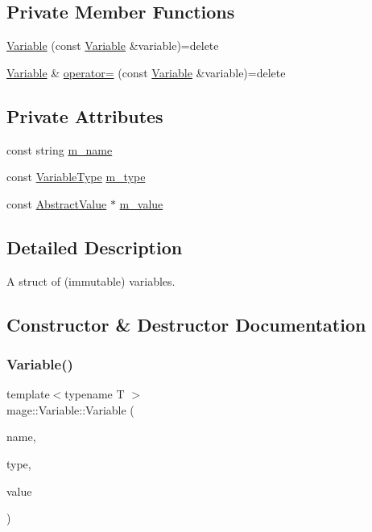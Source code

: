 \subsection*{Private Member Functions}
\begin{DoxyCompactItemize}
\item 
\hyperlink{structmage_1_1_variable_a95b243cd65ea2f9be716545e6c4f4b8e}{Variable} (const \hyperlink{structmage_1_1_variable}{Variable} \&variable)=delete
\item 
\hyperlink{structmage_1_1_variable}{Variable} \& \hyperlink{structmage_1_1_variable_a99029d04b45f356b9681787fdab8a139}{operator=} (const \hyperlink{structmage_1_1_variable}{Variable} \&variable)=delete
\end{DoxyCompactItemize}
\subsection*{Private Attributes}
\begin{DoxyCompactItemize}
\item 
const string \hyperlink{structmage_1_1_variable_afac262aa51bb1dfe447d501abcaa08d0}{m\+\_\+name}
\item 
const \hyperlink{namespacemage_a530428e73bac0ba7fe84b29086a9e33a}{Variable\+Type} \hyperlink{structmage_1_1_variable_acb45a61a0690e0efac614915595c4449}{m\+\_\+type}
\item 
const \hyperlink{structmage_1_1_variable_1_1_abstract_value}{Abstract\+Value} $\ast$ \hyperlink{structmage_1_1_variable_a99388f3fbccf983b8d6954fd31d0eb27}{m\+\_\+value}
\end{DoxyCompactItemize}


\subsection{Detailed Description}
A struct of (immutable) variables. 

\subsection{Constructor \& Destructor Documentation}
\hypertarget{structmage_1_1_variable_a86a59487f5ae51954f75a27b6c9487ce}{}\label{structmage_1_1_variable_a86a59487f5ae51954f75a27b6c9487ce} 
\subsubsection{\texorpdfstring{Variable()}{Variable()}\hspace{0.1cm}{\footnotesize\ttfamily [1/2]}}
{\footnotesize\ttfamily template$<$typename T $>$ \\
mage\+::\+Variable\+::\+Variable (\begin{DoxyParamCaption}\item[{const string \&}]{name,  }\item[{\hyperlink{namespacemage_a530428e73bac0ba7fe84b29086a9e33a}{Variable\+Type}}]{type,  }\item[{const T $\ast$}]{value }\end{DoxyParamCaption})}

